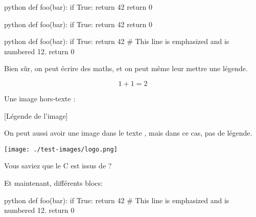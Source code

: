 \documentclass[small]{zmdocument}
\begin{document}
\begin{CodeBlock}{python}
def foo(bar):
    if True:
        return 42
    return 0
\end{CodeBlock}

\begin{CodeBlock}[][1, 3-4]{python}
def foo(bar):
    if True:
        return 42
    return 0
\end{CodeBlock}

\begin{CodeBlock}[][12][10]{python}
def foo(bar):
    if True:
        return 42 # This line is emphasized and is numbered 12.
    return 0
\end{CodeBlock}

Bien sûr, on peut écrire des maths, et on peut même leur mettre une légende.

\[
   1 + 1 = 2
\]

Une image hors-texte :

[Légende de l’image]

On peut aussi avoir une image dans le texte , mais dans ce cas, pas de légende.

\begin{center}
\texttt{[image: ./test-images/logo.png]}
\end{center}

Vous saviez que le C est issus de  ?


Et maintenant, différents blocs:

\begin{Information}
\blindtext
\begin{Question}
\blindtext
\end{Question}
\end{Information}

\begin{Question}
\blindtext
\begin{CodeBlock}[][12][10]{python}
def foo(bar):
    if True:
        return 42 # This line is emphasized and is numbered 12.
    return 0
\end{CodeBlock}
\blindtext
\end{Question}

\begin{Warning}
\blindtext
\end{Warning}
\end{document}
